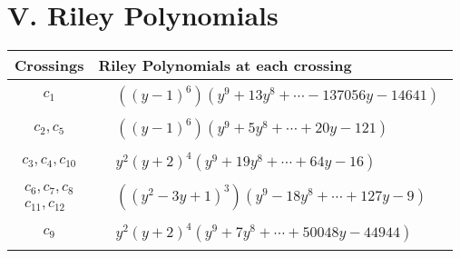 \documentclass[1p]{elsarticle_modified}
\theoremstyle{definition}
\begin{document}
\centering \section*{ V. Riley Polynomials}
\begin{tabular}{m{50pt}|m{274pt}}
Crossings & \hspace{64pt}Riley Polynomials at each crossing \\
\hline $$\begin{aligned}c_{1}\end{aligned}$$&$\begin{aligned}
&((y-1)^6)(y^9+13 y^8+\cdots-137056 y-14641)
\end{aligned}$\\
\hline $$\begin{aligned}c_{2},c_{5}\end{aligned}$$&$\begin{aligned}
&((y-1)^6)(y^9+5 y^8+\cdots+20 y-121)
\end{aligned}$\\
\hline $$\begin{aligned}c_{3},c_{4},c_{10}\end{aligned}$$&$\begin{aligned}
&y^2(y+2)^4(y^9+19 y^8+\cdots+64 y-16)
\end{aligned}$\\
\hline $$\begin{aligned}c_{6},c_{7},c_{8}\\c_{11},c_{12}\end{aligned}$$&$\begin{aligned}
&((y^2-3 y+1)^3)(y^9-18 y^8+\cdots+127 y-9)
\end{aligned}$\\
\hline $$\begin{aligned}c_{9}\end{aligned}$$&$\begin{aligned}
&y^2(y+2)^4(y^{9}+7 y^{8}+\cdots+50048 y-44944)
\end{aligned}$\\
\hline
\end{tabular}
\vskip 2pc
\end{document}
